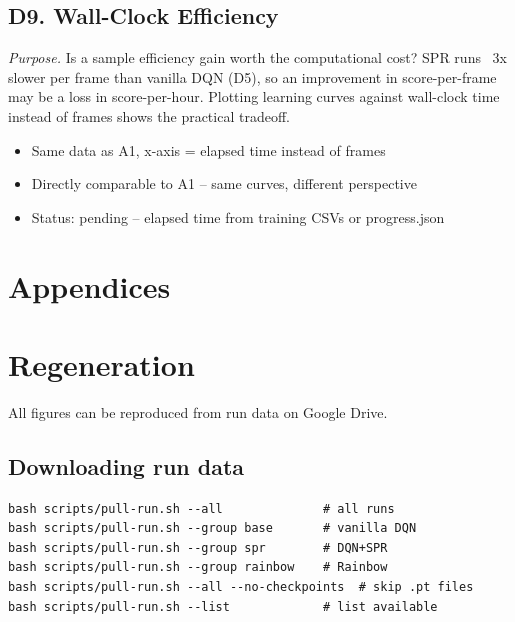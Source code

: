 \documentclass[11pt]{article}
\begin{document}
\vspace{0.5em}

\subsection*{D9. Wall-Clock Efficiency}

\noindent\textit{Purpose.} Is a sample efficiency gain worth the
computational cost? SPR runs ~3x slower per frame than vanilla
DQN (D5), so an improvement in score-per-frame may be a loss in
score-per-hour. Plotting learning curves against wall-clock time
instead of frames shows the practical tradeoff.

\begin{itemize}[leftmargin=2em, itemsep=0.1em, topsep=0.3em]
  \item Same data as A1, x-axis = elapsed time instead of frames
  \item Directly comparable to A1 -- same curves, different
    perspective
  \item Status: pending -- elapsed time from training CSVs or
    progress.json
\end{itemize}


\newpage
\appendix
\section*{Appendices}

\section{Regeneration}
\label{app:regen}

All figures can be reproduced from run data on Google Drive.

\subsection{Downloading run data}
\label{app:download}

\begin{verbatim}
bash scripts/pull-run.sh --all              # all runs
bash scripts/pull-run.sh --group base       # vanilla DQN
bash scripts/pull-run.sh --group spr        # DQN+SPR
bash scripts/pull-run.sh --group rainbow    # Rainbow
bash scripts/pull-run.sh --all --no-checkpoints  # skip .pt files
bash scripts/pull-run.sh --list             # list available
\end{verbatim}
\end{document}

